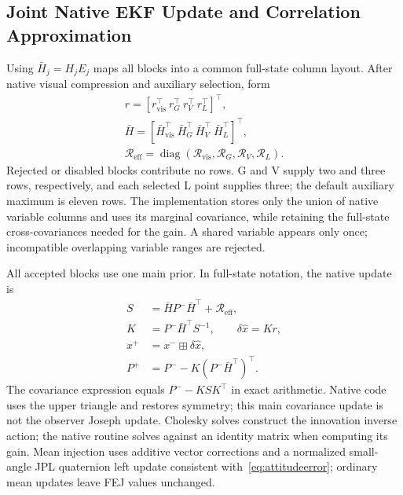 \documentclass[a4paper,runningheads,twocolumn]{llncs}
\newcommand{\diag}{\operatorname{diag}}
\begin{document}
\subsection{Joint Native EKF Update and Correlation Approximation}
Using $\bar H_j=H_jE_j$ maps all blocks into a common full-state column layout. After native visual compression and auxiliary selection, form
\begin{equation}
 \begin{gathered}
 r=[r_{\mathrm{vis}}^\top\ r_G^\top\ r_V^\top\ r_L^\top]^\top,\\
 \bar H=[\bar H_{\mathrm{vis}}^\top\ \bar H_G^\top\
          \bar H_V^\top\ \bar H_L^\top]^\top,\\
 \mathcal R_{\mathrm{eff}}=\diag(\mathcal R_{\mathrm{vis}},
                  \mathcal R_G,\mathcal R_V,\mathcal R_L).
 \end{gathered}
 \label{eq:joint}
\end{equation}
Rejected or disabled blocks contribute no rows. G and V supply two and three rows, respectively, and each selected L point supplies three; the default auxiliary maximum is eleven rows. The implementation stores only the union of native variable columns and uses its marginal covariance, while retaining the full-state cross-covariances needed for the gain. A shared variable appears only once; incompatible overlapping variable ranges are rejected.

All accepted blocks use one main prior. In full-state notation, the native update is
\begin{equation}
 \begin{aligned}
 S&=\bar HP^-\bar H^\top+\mathcal R_{\mathrm{eff}},\\
 K&=P^-\bar H^\top S^{-1},\qquad\delta\hat x=Kr,\\
 x^+&=x^-\boxplus\delta\hat x,\\
 P^+&=P^--K(P^-\bar H^\top)^\top.
 \end{aligned}
 \label{eq:ekf}
\end{equation}
The covariance expression equals $P^--KSK^\top$ in exact arithmetic. Native code uses the upper triangle and restores symmetry; this main covariance update is not the observer Joseph update. Cholesky solves construct the innovation inverse action; the native routine solves against an identity matrix when computing its gain. Mean injection uses additive vector corrections and a normalized small-angle JPL quaternion left update consistent with~\eqref{eq:attitudeerror}; ordinary mean updates leave FEJ values unchanged.
\end{document}
